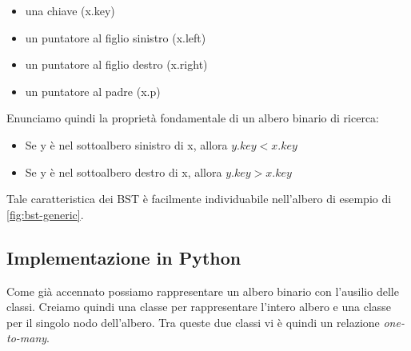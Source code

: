\documentclass{article}
\begin{document}
\begin{itemize}
    \item una chiave (x.key)
    \item un puntatore al figlio sinistro (x.left)
    \item un puntatore al figlio destro (x.right)
    \item un puntatore al padre (x.p)
\end{itemize}

Enunciamo quindi la proprietà fondamentale di un albero binario di ricerca:

\begin{center}
\begin{mybox}
	\begin{itemize}
    \item Se y è nel sottoalbero sinistro di x, allora \(y.key < x.key\) 
     \item Se y è nel sottoalbero destro di x, allora \(y.key > x.key\) 
	\end{itemize}
\end{mybox}
\end{center}
\label{prop:bst-prop} 

Tale caratteristica dei BST è facilmente individuabile nell'albero di esempio di \cref{fig:bst-generic}. 




\subsection{Implementazione in Python}

Come già accennato possiamo rappresentare un albero binario con l'ausilio delle classi. Creiamo quindi una classe per rappresentare l'intero albero e una classe per il singolo nodo dell'albero. Tra queste due classi vi è quindi un relazione 
\textit{one-to-many}.

\vspace{5pt}
\end{document}
